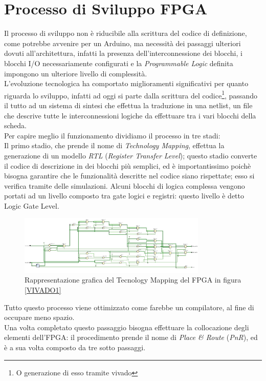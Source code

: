 \section{Processo di Sviluppo FPGA}
Il processo di sviluppo non è riducibile alla scrittura del codice di definizione, come potrebbe avvenire per un Arduino, ma necessità dei passaggi ulteriori dovuti all'architettura, infatti la presenza dell'interconnessione dei blocchi, i blocchi I/O necessariamente configurati e la \textit{Programmable Logic} definita impongono un ulteriore livello di complessità.\\
L'evoluzione tecnologica ha comportato miglioramenti significativi per quanto riguarda lo sviluppo, infatti ad oggi si parte dalla scrittura del codice\footnote{O generazione di esso tramite vivado}, passando il tutto ad un sistema di sintesi che effettua la traduzione in una netlist, un file che descrive tutte le interconnessioni logiche da effettuare tra i vari blocchi della scheda.\\
Per capire meglio il funzionamento dividiamo il processo in tre stadi:\\
Il primo stadio, che prende il nome di \textit{Technology Mapping}, effettua la generazione di un modello \textit{RTL} (\textit{Register Transfer Level}); questo stadio converte il codice di descrizione in dei blocchi più semplici, ed è importantissimo poichè bisogna garantire che le funzionalità descritte nel codice siano rispettate; esso si verifica tramite delle simulazioni. Alcuni blocchi di logica complessa vengono portati ad un livello composto tra gate logici e registri: questo livello è detto Logic Gate Level.
\begin{figure}[h]
\centering
\includegraphics[width=0.8\textwidth]{images/RTL.jpg}
\caption{Rappresentazione grafica del Tecnology Mapping del FPGA in figura \ref{VIVADO1}}
\end{figure}\clearpage
Tutto questo processo viene ottimizzato come farebbe un compilatore, al fine di occupare meno spazio.\\
Una volta completato questo passaggio bisogna effettuare la collocazione degli elementi dell'FPGA: il procedimento prende il nome di \textit{Place \& Route} (\textit{PnR}), ed è a sua volta composto da tre sotto passaggi.\\
